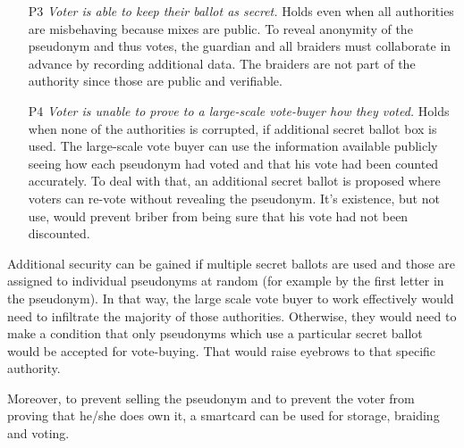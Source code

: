 \documentclass[12pt,a4paper]{article}
\begin{document}
\begin{itemize}
\item
[P3] \textit{Voter is able to keep their ballot as secret.} Holds even when all authorities are misbehaving because mixes are public. To reveal anonymity of the pseudonym and thus votes, the guardian and all braiders must collaborate in advance by recording additional data. The braiders are not part of the authority since those are public and verifiable.\par
\item
[P4] \textit{Voter is unable to prove to a large-scale vote-buyer how they voted.} Holds when none of the authorities is corrupted, if additional secret ballot box is used. The large-scale vote buyer can use the information available publicly seeing how each pseudonym had voted and that his vote had been counted accurately. To deal with that, an additional secret ballot is proposed where voters can re-vote without revealing the pseudonym. It's existence, but not use, would prevent briber from being sure that his vote had not been discounted.\par
\end{itemize}
Additional security can be gained if multiple secret ballots are used and those are assigned to individual pseudonyms at random (for example by the first letter in the pseudonym). In that way, the large scale vote buyer to work effectively would need to infiltrate the majority of those authorities. Otherwise, they would need to make a condition that only pseudonyms which use a particular secret ballot would be accepted for vote-buying. That would raise eyebrows to that specific authority.\par
Moreover, to prevent selling the pseudonym and to prevent the voter from proving that he/she does own it, a smartcard can be used for storage, braiding and voting.\par
\end{document}
